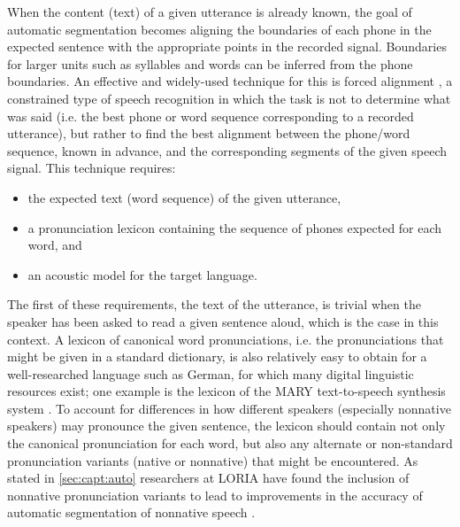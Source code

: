 	
	When the content (text) of a given utterance is already known, the goal of automatic segmentation becomes aligning the  boundaries of each phone in the expected sentence with the appropriate points in the recorded signal. Boundaries for larger units such as syllables and words can be inferred from the phone boundaries. 
	An effective and widely-used technique for this is 
	forced
	alignment \citep{Fohr1996,Mesbahi2011,Fohr2012,Fauth2014},
	a constrained type of speech recognition in which the task is not to determine what was said (i.e. the best phone or word sequence corresponding to a recorded utterance),  but rather to find the best alignment between the phone/word sequence, known in advance, and the corresponding segments of the given speech signal.
	This technique	requires:
	\begin{itemize}[topsep=-1em]
	\item the expected text (word sequence) of the given utterance, 
	\item a pronunciation lexicon containing the sequence of phones expected for each word, and
	\item an acoustic model for the target language.
	\end{itemize}
	
	The first of these requirements, the text of the utterance, is trivial when the speaker has been asked to read a given sentence aloud, which is the case in this context.
	A lexicon of canonical word pronunciations, i.e. the pronunciations that might be given in a standard dictionary, is also relatively easy to obtain for a well-researched language such as German, for which many digital linguistic resources exist; one example is the lexicon of the MARY text-to-speech synthesis system \citep{Schroeder2003}.
	 To account for differences in how different speakers (especially nonnative speakers) may pronounce the given sentence, 
	the lexicon should contain not only the canonical pronunciation for each word, but also any alternate or non-standard pronunciation variants (native or nonnative) that might be encountered. As stated in \cref{sec:capt:auto} researchers at LORIA have found the inclusion of nonnative pronunciation variants to lead to improvements in the accuracy of automatic segmentation of nonnative speech \citep{Jouvet2011,Mesbahi2011,Bonneau2012,Orosanu2012}.
	
